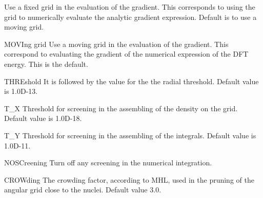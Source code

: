 \begin{keywordlist}
Use a fixed grid in the evaluation of the gradient. This corresponds to
using the grid to numerically evaluate the analytic gradient expression.
Default is to use a moving grid.
\item[MOVIng grid]
Use a moving grid in the evaluation of the gradient. This correspond to
evaluating the gradient of the numerical expression of the DFT energy. This is the default.
\item[THREshold]
It is followed by the value for the the radial threshold.
Default value is 1.0D{}-13.
\item[T\_X]
Threshold for screening in the assembling of the density on the grid.
Default value is 1.0D{}-18.
\item[T\_Y]
Threshold for screening in the assembling of the integrals.
Default value is 1.0D{}-11.
\item[NOSCreening]
Turn off any screening in the numerical integration.
\item[CROWding]
The crowding factor, according to MHL, used in the pruning of the angular
grid close to the nuclei. Default value 3.0.
\end{keywordlist}

